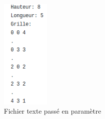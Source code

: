\begin{figure}[htp]
  \centering
  \includegraphics[width=2.35cm]{images/FichierTexte}
  \caption{Fichier texte passé en paramètre}
\end{figure}
